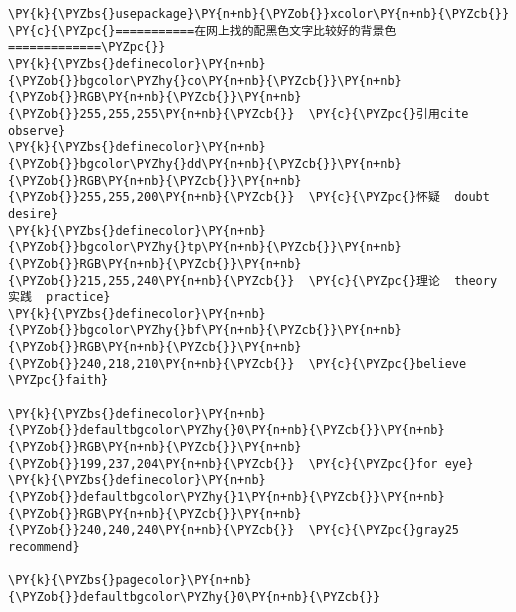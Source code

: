 \begin{Verbatim}[commandchars=\\\{\}]
\PY{k}{\PYZbs{}usepackage}\PY{n+nb}{\PYZob{}}xcolor\PY{n+nb}{\PYZcb{}}
\PY{c}{\PYZpc{}===========在网上找的配黑色文字比较好的背景色=============\PYZpc{}}
\PY{k}{\PYZbs{}definecolor}\PY{n+nb}{\PYZob{}}bgcolor\PYZhy{}co\PY{n+nb}{\PYZcb{}}\PY{n+nb}{\PYZob{}}RGB\PY{n+nb}{\PYZcb{}}\PY{n+nb}{\PYZob{}}255,255,255\PY{n+nb}{\PYZcb{}}  \PY{c}{\PYZpc{}引用cite  observe}
\PY{k}{\PYZbs{}definecolor}\PY{n+nb}{\PYZob{}}bgcolor\PYZhy{}dd\PY{n+nb}{\PYZcb{}}\PY{n+nb}{\PYZob{}}RGB\PY{n+nb}{\PYZcb{}}\PY{n+nb}{\PYZob{}}255,255,200\PY{n+nb}{\PYZcb{}}  \PY{c}{\PYZpc{}怀疑  doubt desire}
\PY{k}{\PYZbs{}definecolor}\PY{n+nb}{\PYZob{}}bgcolor\PYZhy{}tp\PY{n+nb}{\PYZcb{}}\PY{n+nb}{\PYZob{}}RGB\PY{n+nb}{\PYZcb{}}\PY{n+nb}{\PYZob{}}215,255,240\PY{n+nb}{\PYZcb{}}  \PY{c}{\PYZpc{}理论  theory 实践  practice}
\PY{k}{\PYZbs{}definecolor}\PY{n+nb}{\PYZob{}}bgcolor\PYZhy{}bf\PY{n+nb}{\PYZcb{}}\PY{n+nb}{\PYZob{}}RGB\PY{n+nb}{\PYZcb{}}\PY{n+nb}{\PYZob{}}240,218,210\PY{n+nb}{\PYZcb{}}  \PY{c}{\PYZpc{}believe \PYZpc{}faith}

\PY{k}{\PYZbs{}definecolor}\PY{n+nb}{\PYZob{}}defaultbgcolor\PYZhy{}0\PY{n+nb}{\PYZcb{}}\PY{n+nb}{\PYZob{}}RGB\PY{n+nb}{\PYZcb{}}\PY{n+nb}{\PYZob{}}199,237,204\PY{n+nb}{\PYZcb{}}  \PY{c}{\PYZpc{}for eye}
\PY{k}{\PYZbs{}definecolor}\PY{n+nb}{\PYZob{}}defaultbgcolor\PYZhy{}1\PY{n+nb}{\PYZcb{}}\PY{n+nb}{\PYZob{}}RGB\PY{n+nb}{\PYZcb{}}\PY{n+nb}{\PYZob{}}240,240,240\PY{n+nb}{\PYZcb{}}  \PY{c}{\PYZpc{}gray25  recommend}

\PY{k}{\PYZbs{}pagecolor}\PY{n+nb}{\PYZob{}}defaultbgcolor\PYZhy{}0\PY{n+nb}{\PYZcb{}}
\end{Verbatim}
